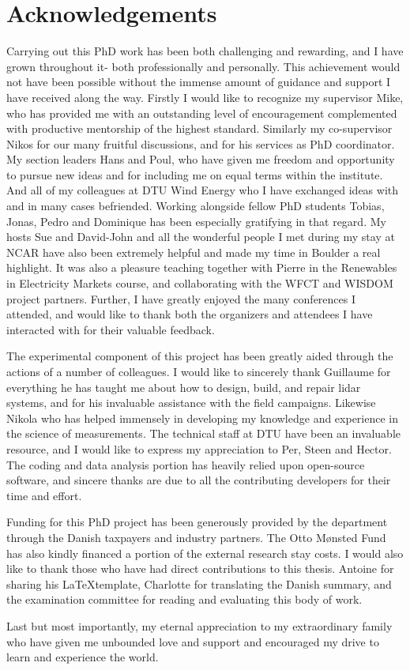 \chapter{Acknowledgements}
\label{sec:acknowledgements}

Carrying out this PhD work has been both challenging and rewarding, and I have grown throughout it- both professionally and personally. This achievement would not have been possible without the immense amount of guidance and support I have received along the way. Firstly I would like to recognize my supervisor Mike, who has provided me with an outstanding level of encouragement complemented with productive mentorship of the highest standard. Similarly my co-supervisor Nikos for our many fruitful discussions, and for his services as PhD coordinator. My section leaders Hans and Poul, who have given me freedom and opportunity to pursue new ideas and for including me on equal terms within the institute. And all of my colleagues at DTU Wind Energy who I have exchanged ideas with and in many cases befriended. Working alongside fellow PhD students Tobias, Jonas, Pedro and Dominique has been especially gratifying in that regard. My hosts Sue and David-John and all the wonderful people I met during my stay at NCAR have also been extremely helpful and made my time in Boulder a real highlight. It was also a pleasure teaching together with Pierre in the Renewables in Electricity Markets course, and collaborating with the WFCT and WISDOM project partners. Further, I have greatly enjoyed the many conferences I attended, and would like to thank both the organizers and attendees I have interacted with for their valuable feedback.

The experimental component of this project has been greatly aided through the actions of a number of colleagues. I would like to sincerely thank Guillaume for everything he has taught me about how to design, build, and repair lidar systems, and for his invaluable assistance with the field campaigns. Likewise Nikola who has helped immensely in developing my knowledge and experience in the science of measurements. The technical staff at DTU have been an invaluable resource, and I would like to express my appreciation to Per, Steen and Hector. The coding and data analysis portion has heavily relied upon open-source software, and sincere thanks are due to all the contributing developers for their time and effort.

Funding for this PhD project has been generously provided by the department through the Danish taxpayers and industry partners. The Otto M{\o}nsted Fund has also kindly financed a portion of the external research stay costs. I would also like to thank those who have had direct contributions to this thesis. Antoine for sharing his \LaTeX template, Charlotte for translating the Danish summary, and the examination committee for reading and evaluating this body of work.

Last but most importantly, my eternal appreciation to my extraordinary family who have given me unbounded love and support and encouraged my drive to learn and experience the world.


\begin{comment}
\end{comment}
